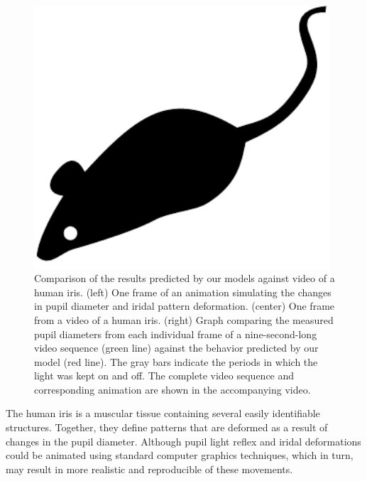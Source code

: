 \documentclass{acmtog}
\begin{document}
\begin{figure}[t]
\centerline{\includegraphics[width=11cm]{TOG-Sample-mouse}}
\caption{Comparison of the results predicted by our models against video of a human iris. (left) One frame of an
animation simulating the changes in pupil diameter and iridal pattern deformation. (center) One frame from a video of a
human iris. (right) Graph comparing the measured pupil diameters from each individual frame of a nine-second-long video
sequence (green line) against the behavior predicted by our model (red line). The gray bars indicate the periods in which
the light was kept on and off. The complete video sequence and corresponding animation are shown in the accompanying
video.}    
  \label{fig:videocomparison}
\end{figure}

The human iris is a muscular tissue containing several easily identifiable structures. Together, they define patterns that
are deformed as a result of changes in the pupil diameter. Although pupil light reflex and iridal deformations could be
animated using standard computer graphics techniques, which in turn, may result in more realistic and reproducible of these movements.
\end{document}
